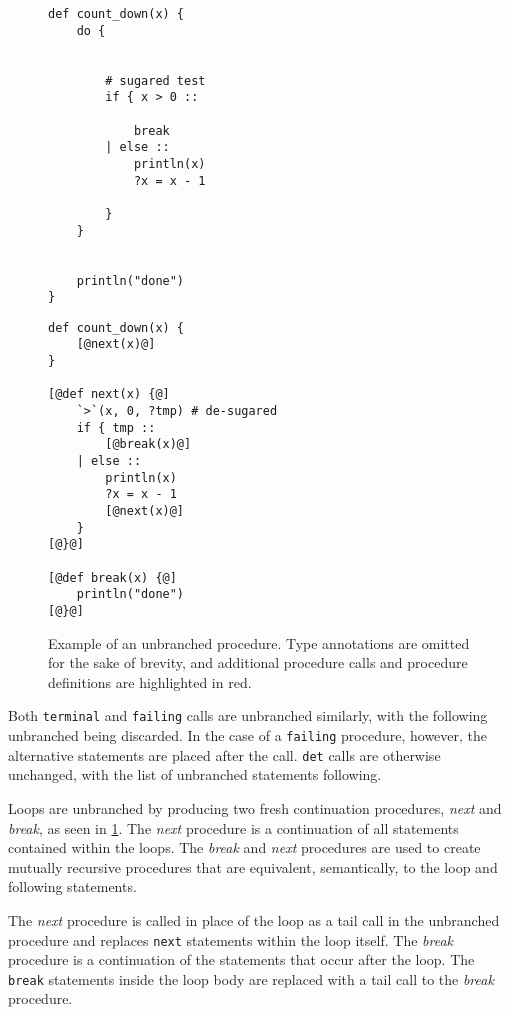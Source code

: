 \begin{figure}[ht]
  \begin{minipage}[t]{0.48\textwidth}
    \begin{lstlisting}
def count_down(x) {
    do {


        # sugared test
        if { x > 0 :: 
    
            break
        | else ::
            println(x)
            ?x = x - 1
    
        }
    }


    println("done")
}
\end{lstlisting}
  \end{minipage}\hfill
  \begin{minipage}[t]{0.48\textwidth}
    \begin{lstlisting}[numbers=none]
def count_down(x) {
    [@next(x)@]
}

[@def next(x) {@]
    `>`(x, 0, ?tmp) # de-sugared
    if { tmp :: 
        [@break(x)@]
    | else :: 
        println(x)
        ?x = x - 1
        [@next(x)@]
    }
[@}@]

[@def break(x) {@]
    println("done")
[@}@]
\end{lstlisting}
  \end{minipage}
  \caption[Example of an unbranched procedure.]{Example of an unbranched procedure. Type annotations are omitted for the sake of brevity, and additional procedure calls and procedure definitions are highlighted in \textcolor{rred}{red}.}
  \label{lst:unbranching}
\end{figure}

Both \texttt{terminal} and \texttt{failing} calls are unbranched similarly, with the following unbranched being discarded. In the case of a \texttt{failing} procedure, however, the alternative statements are placed after the call. \texttt{det} calls are otherwise unchanged, with the list of unbranched statements following.

Loops are unbranched by producing two fresh continuation procedures, \textit{next} and \textit{break}, as seen in \cref{lst:unbranching}. The \textit{next} procedure is a continuation of all statements contained within the loops. The \textit{break} and \textit{next} procedures are used to create mutually recursive procedures that are equivalent, semantically, to the loop and following statements.

The \textit{next} procedure is called in place of the loop as a tail call in the unbranched procedure and replaces \texttt{next} statements within the loop itself. The \textit{break} procedure is a continuation of the statements that occur after the loop. The \texttt{break} statements inside the loop body are replaced with a tail call to the \textit{break} procedure. 

